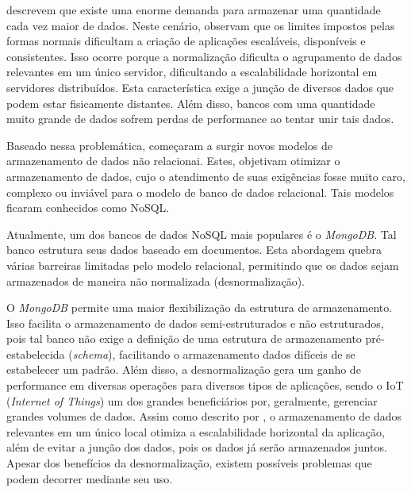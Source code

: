 
 descrevem que existe uma enorme demanda para armazenar uma quantidade cada vez maior de dados. Neste cenário,  observam que os limites impostos pelas formas normais dificultam a criação de aplicações escaláveis, disponíveis e consistentes. Isso ocorre porque a normalização dificulta o agrupamento de dados relevantes em um único servidor, dificultando a escalabilidade horizontal em servidores distribuídos. Esta característica exige a junção de diversos dados que podem estar fisicamente distantes. Além disso, bancos com uma quantidade muito grande de dados sofrem perdas de performance ao tentar unir tais dados.

Baseado nessa problemática, começaram a surgir novos modelos de armazenamento de dados não relacionai. Estes, objetivam otimizar o armazenamento de dados, cujo o atendimento de suas exigências fosse muito caro, complexo ou inviável para o modelo de banco de dados relacional. Tais modelos ficaram conhecidos como NoSQL.

Atualmente, um dos bancos de dados NoSQL mais populares é o \textit{MongoDB}.
Tal banco estrutura seus dados baseado em documentos. Esta abordagem quebra várias barreiras limitadas pelo modelo relacional, permitindo que os dados sejam armazenados de maneira não normalizada (desnormalização).

O \textit{MongoDB} permite uma maior flexibilização da estrutura de armazenamento. Isso facilita o armazenamento de dados semi-estruturados e não estruturados, pois tal banco não exige a definição de uma estrutura de armazenamento pré-estabelecida (\textit{schema}), facilitando o armazenamento dados difíceis de se estabelecer um padrão. Além disso, a desnormalização gera um ganho de performance em diversas operações para diversos tipos de aplicações, sendo o IoT (\textit{Internet of Things}) um dos grandes beneficiários por, geralmente, gerenciar grandes volumes de dados. Assim como descrito por \cite{davoudian2018survey}, o armazenamento de dados relevantes em um único local otimiza a escalabilidade horizontal da aplicação, além de evitar a junção dos dados, pois os dados já serão armazenados juntos. Apesar dos benefícios da desnormalização, existem possíveis problemas que podem decorrer mediante seu uso.

